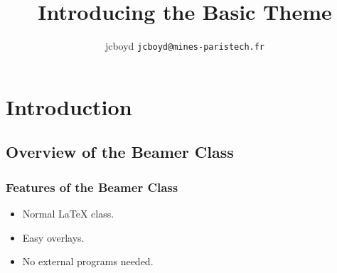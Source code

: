 \documentclass{beamer}
\title{Introducing the Basic Theme}
\author[Joseph Boyd]{jcboyd \texttt{jcboyd@mines-paristech.fr}}
\begin{document}
\frame{\titlepage}


\section{Introduction}
\subsection{Overview of the Beamer Class}
\frame
{
  \frametitle{Features of the Beamer Class}

  \begin{itemize}
  \item<1-> Normal LaTeX class.
  \item<2-> Easy overlays.
  \item<3-> No external programs needed.      
  \end{itemize}
}
\end{document}
